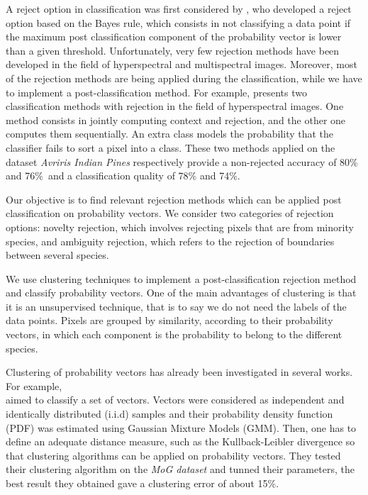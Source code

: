 \documentclass{siamart171218}
\begin{document}
A reject option in classification was first considered by \cite{5222035}, who developed a reject option based on the Bayes rule, which consists in not classifying a data point if the maximum post classification component of the probability vector is lower than a given threshold. Unfortunately, very few rejection methods have been developed in the field of hyperspectral and multispectral images. Moreover, most of the rejection methods are being applied during the classification, while we have to implement a post-classification method. For example, \cite{7326344} presents two classification methods with rejection in the field of hyperspectral images. One method consists in jointly computing context and rejection, and the other one computes them sequentially. An extra class models the probability that the classifier fails to sort a pixel into a class. These two methods applied on the dataset \textit{Avriris Indian Pines} respectively provide a non-rejected accuracy of 80\% and 76\%\ and a classification quality of 78\% and 74\%.

Our objective is to find relevant rejection methods which can be applied post classification on probability vectors. 
We consider two categories of rejection options: novelty rejection, which involves rejecting pixels that are from minority species, and ambiguity rejection, which refers to the rejection of boundaries between several species.


We use clustering techniques to implement a post-classification rejection method and classify probability vectors. One of the main advantages of clustering is that it is an unsupervised technique, that is to say we do not need the labels of the data points. Pixels are grouped by similarity, according to their probability vectors, in which each component is the probability to belong to the different species.

Clustering of probability vectors has already been investigated in several works. For example,\\ \cite{Classifier_based_affinities} aimed to classify a set of vectors. Vectors were considered as independent and identically distributed (i.i.d) samples  and their probability density function (PDF) was estimated using Gaussian Mixture Models (GMM). Then, one has to define an adequate distance measure, such as the Kullback-Leibler divergence so that clustering algorithms can be applied on probability vectors. They tested their clustering algorithm on the \textit{MoG dataset} and tunned their parameters, the best result they obtained gave a clustering error of about 15\%.
\end{document}
